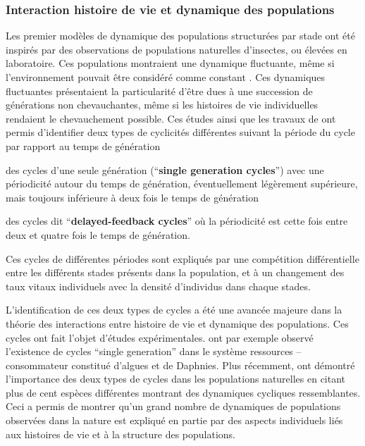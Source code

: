 \subsubsection{Interaction histoire de vie et dynamique des populations}
\label{modelPopStru}
Les premier modèles de dynamique des populations structurées par stade
\autocites{gurney1980a,gurney1983a,nisbet1983a,lawton1981a} ont été inspirés par
des observations de populations naturelles d'insectes, ou élevées en
laboratoire.
Ces populations montraient une dynamique fluctuante, même si l'environnement
pouvait être considéré comme constant
\autocites{nicholson1954a,gurney1983a,ebenman1988a,godfray1989a}. Ces dynamiques
fluctuantes présentaient la particularité d'être dues à une succession de
générations non chevauchantes, même si les histoires de vie individuelles
rendaient le chevauchement possible. Ces études ainsi que les travaux de
\textcite{gurney1985a} ont permis d'identifier deux types de cyclicités
différentes suivant la période du cycle par rapport au temps de génération
\begin{enumerate*}[label=(\roman*), before=\unskip{ : }, itemjoin={{ ; }},
itemjoin*={{ ; et }}]
  \item des cycles d'une seule génération (``\textbf{single generation
  cycles}'') avec une périodicité autour du temps de génération, éventuellement légèrement
  supérieure, mais toujours inférieure à deux fois le temps de génération \item
  des cycles dit ``\textbf{delayed-feedback cycles}'' où la périodicité est
  cette fois entre deux et quatre fois le temps de génération.
\end{enumerate*} 
Ces cycles de différentes périodes sont expliqués par une compétition
différentielle entre les différents stades présents dans la population, et à un
changement des taux vitaux individuels avec la densité d'individus dans chaque
stades.

L'identification de ces deux types de cycles a été une avancée majeure dans la
théorie des interactions entre histoire de vie et dynamique des populations. 
Ces cycles ont fait l'objet d'études expérimentales.
\textcite{mccauley1987a} ont par exemple observé l'existence de cycles ``single
generation'' dans le système ressources -- consommateur constitué d'algues et de
Daphnies. Plus récemment, \textcite{murdoch2002a} ont démontré l'importance des
deux types de cycles dans les populations naturelles en citant plus de cent
espèces différentes montrant des dynamiques cycliques ressemblantes. Ceci a
permis de montrer qu'un grand nombre de dynamiques de populations observées dans
la nature est expliqué en partie par des aspects individuels liés aux
histoires de vie et à la structure des populations.

